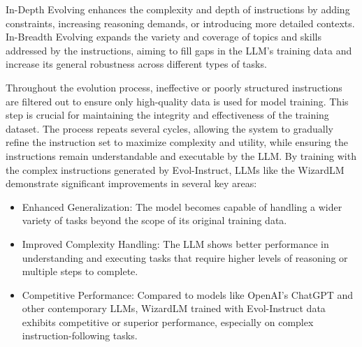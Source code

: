 \begin{itemize}
{		      In-Depth Evolving enhances the complexity and depth of instructions by adding constraints, increasing reasoning demands, or introducing more detailed contexts.
		      In-Breadth Evolving expands the variety and coverage of topics and skills addressed by the instructions, aiming to fill gaps in the LLM’s training data and increase its general robustness across different types of tasks.

		      Throughout the evolution process, ineffective or poorly structured instructions are filtered out to ensure only high-quality data is used for model training. This step is crucial for maintaining the integrity and effectiveness of the training dataset.
		      The process repeats several cycles, allowing the system to gradually refine the instruction set to maximize complexity and utility, while ensuring the instructions remain understandable and executable by the LLM.
		      By training with the complex instructions generated by Evol-Instruct, LLMs like the WizardLM demonstrate significant improvements in several key areas:
		      \begin{itemize}
			      \item Enhanced Generalization: The model becomes capable of handling a wider variety of tasks beyond the scope of its original training data.
			      \item Improved Complexity Handling: The LLM shows better performance in understanding and executing tasks that require higher levels of reasoning or multiple steps to complete.
			      \item Competitive Performance: Compared to models like OpenAI's ChatGPT and other contemporary LLMs, WizardLM trained with Evol-Instruct data exhibits competitive or superior performance, especially on complex instruction-following tasks.
		      \end{itemize}
	      }
\end{itemize}


